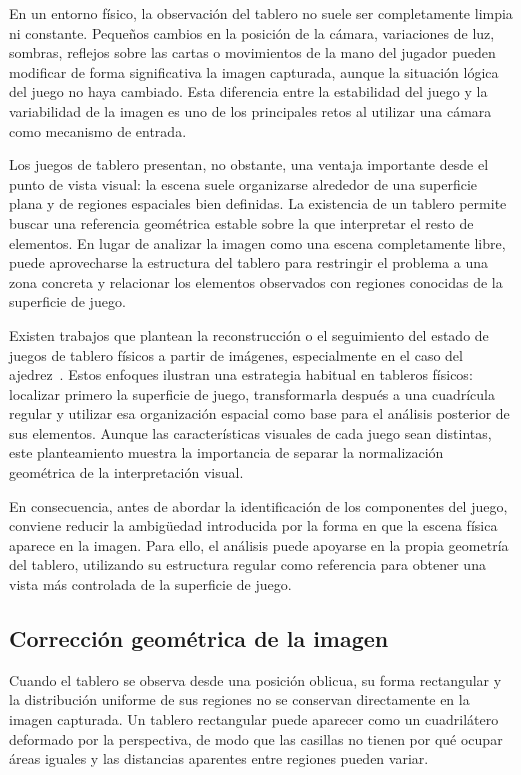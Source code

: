 En un entorno físico, la observación del tablero no suele ser completamente limpia ni constante. Pequeños cambios en la posición de la cámara, variaciones de luz, sombras, reflejos sobre las cartas o movimientos de la mano del jugador pueden modificar de forma significativa la imagen capturada, aunque la situación lógica del juego no haya cambiado. Esta diferencia entre la estabilidad del juego y la variabilidad de la imagen es uno de los principales retos al utilizar una cámara como mecanismo de entrada.

Los juegos de tablero presentan, no obstante, una ventaja importante desde el punto de vista visual: la escena suele organizarse alrededor de una superficie plana y de regiones espaciales bien definidas. La existencia de un tablero permite buscar una referencia geométrica estable sobre la que interpretar el resto de elementos. En lugar de analizar la imagen como una escena completamente libre, puede aprovecharse la estructura del tablero para restringir el problema a una zona concreta y relacionar los elementos observados con regiones conocidas de la superficie de juego.

Existen trabajos que plantean la reconstrucción o el seguimiento del estado de juegos de tablero físicos a partir de imágenes, especialmente en el caso del ajedrez~\cite{wolflein2021chessState,koray2016chessTracking,masouris2023endToEndChess}. Estos enfoques ilustran una estrategia habitual en tableros físicos: localizar primero la superficie de juego, transformarla después a una cuadrícula regular y utilizar esa organización espacial como base para el análisis posterior de sus elementos. Aunque las características visuales de cada juego sean distintas, este planteamiento muestra la importancia de separar la normalización geométrica de la interpretación visual.

En consecuencia, antes de abordar la identificación de los componentes del juego, conviene reducir la ambigüedad introducida por la forma en que la escena física aparece en la imagen. Para ello, el análisis puede apoyarse en la propia geometría del tablero, utilizando su estructura regular como referencia para obtener una vista más controlada de la superficie de juego.


\subsection{Corrección geométrica de la imagen}

Cuando el tablero se observa desde una posición oblicua, su forma rectangular y la distribución uniforme de sus regiones no se conservan directamente en la imagen capturada. Un tablero rectangular puede aparecer como un cuadrilátero deformado por la perspectiva, de modo que las casillas no tienen por qué ocupar áreas iguales y las distancias aparentes entre regiones pueden variar.

